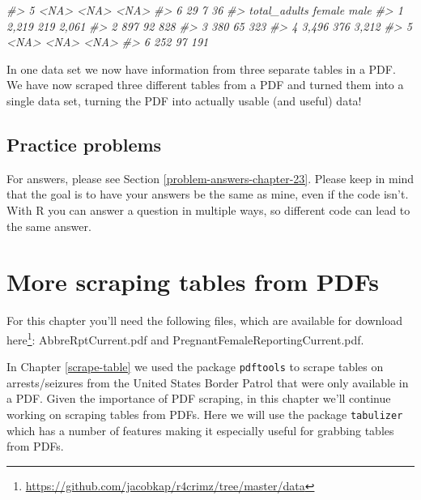 \documentclass[
]{krantz}
\makeatletter
\newenvironment{Shaded}{\begin{snugshade}}{\end{snugshade}}
\newcommand{\CommentTok}[1]{\textcolor[rgb]{0.37,0.37,0.37}{\textit{#1}}}
\renewcommand{\href}[2]{#2\footnote{\url{#1}}}
\newenvironment{kframe}{%
\medskip{}
\setlength{\fboxsep}{.8em}
 \def\at@end@of@kframe{}%
 \ifinner\ifhmode%
  \def\at@end@of@kframe{\end{minipage}}%
  \begin{minipage}{\columnwidth}%
 \fi\fi%
 \def\FrameCommand##1{\hskip\@totalleftmargin \hskip-\fboxsep
 \colorbox{shadecolor}{##1}\hskip-\fboxsep
     \hskip-\linewidth \hskip-\@totalleftmargin \hskip\columnwidth}%
 \MakeFramed {\advance\hsize-\width
   \@totalleftmargin\z@ \linewidth\hsize
   \@setminipage}}%
 {\par\unskip\endMakeFramed%
 \at@end@of@kframe}
\renewenvironment{Shaded}{\begin{kframe}}{\end{kframe}}
\makeatother
\begin{document}
\begin{Shaded}
\begin{Highlighting}[]
\CommentTok{\#\textgreater{} 5                  \textless{}NA\textgreater{}                    \textless{}NA\textgreater{}            \textless{}NA\textgreater{}}
\CommentTok{\#\textgreater{} 6                    29                       7              36}
\CommentTok{\#\textgreater{}   total\_adults female  male}
\CommentTok{\#\textgreater{} 1        2,219    219 2,061}
\CommentTok{\#\textgreater{} 2          897     92   828}
\CommentTok{\#\textgreater{} 3          380     65   323}
\CommentTok{\#\textgreater{} 4        3,496    376 3,212}
\CommentTok{\#\textgreater{} 5         \textless{}NA\textgreater{}   \textless{}NA\textgreater{}  \textless{}NA\textgreater{}}
\CommentTok{\#\textgreater{} 6          252     97   191}
\end{Highlighting}
\end{Shaded}

In one data set we now have information from three separate tables in a PDF. We have now scraped three different tables from a PDF and turned them into a single data set, turning the PDF into actually usable (and useful) data!

\hypertarget{practice-problems-16}{%
\section{Practice problems}\label{practice-problems-16}}

For answers, please see Section \ref{problem-answers-chapter-23}. Please keep in mind that the goal is to have your answers be the same as mine, even if the code isn't. With R you can answer a question in multiple ways, so different code can lead to the same answer.

\hypertarget{scrape-table2}{%
\chapter{More scraping tables from PDFs}\label{scrape-table2}}

For this chapter you'll need the following files, which are available for download \href{https://github.com/jacobkap/r4crimz/tree/master/data}{here}: AbbreRptCurrent.pdf and PregnantFemaleReportingCurrent.pdf.

In Chapter \ref{scrape-table} we used the package \texttt{pdftools} to scrape tables on arrests/seizures from the United States Border Patrol that were only available in a PDF. Given the importance of PDF scraping, in this chapter we'll continue working on scraping tables from PDFs. Here we will use the package \texttt{tabulizer} which has a number of features making it especially useful for grabbing tables from PDFs.
\end{document}
